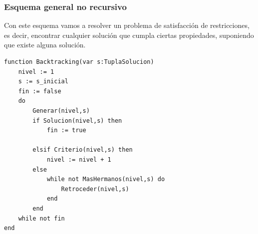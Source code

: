 \documentclass[10pt,a4paper,spanish]{report}
\theoremstyle{definition}
\theoremstyle{remark}
\begin{document}
\subsubsection{\textcolor{electricgreen}Esquema general no recursivo}

Con este esquema vamos a resolver un problema de satisfacción de restricciones, es decir, encontrar cualquier solución que cumpla ciertas propiedades, suponiendo que existe alguna solución.

\begin{verbatim}
function Backtracking(var s:TuplaSolucion)
    nivel := 1
    s := s_inicial
    fin := false
    do
        Generar(nivel,s)
        if Solucion(nivel,s) then
            fin := true

        elsif Criterio(nivel,s) then
            nivel := nivel + 1
        else
            while not MasHermanos(nivel,s) do
                Retroceder(nivel,s)
            end
        end
    while not fin
end
\end{verbatim}
\end{document}
